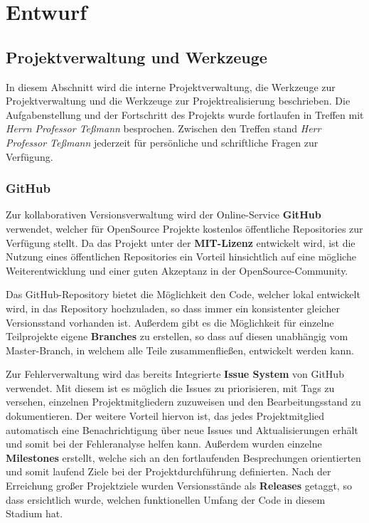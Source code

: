 \chapter{Entwurf}
\section{Projektverwaltung und Werkzeuge}
In diesem Abschnitt wird die interne Projektverwaltung, die Werkzeuge zur Projektverwaltung und die Werkzeuge zur Projektrealisierung beschrieben.
Die Aufgabenstellung und der Fortschritt des Projekts wurde fortlaufen in Treffen mit \textit{Herrn Professor Teßmann} besprochen. Zwischen den Treffen stand \textit{Herr Professor Teßmann} jederzeit für persönliche und schriftliche Fragen zur Verfügung.

\subsection{GitHub}
Zur kollaborativen Versionsverwaltung wird der Online-Service \textbf{GitHub} \cite{GitHub} verwendet, welcher für OpenSource Projekte kostenlos öffentliche Repositories zur Verfügung stellt. Da das Projekt unter der \textbf{MIT-Lizenz} \cite{GitHub:OHMComm License} entwickelt wird, ist die Nutzung eines öffentlichen Repositories ein Vorteil hinsichtlich auf eine mögliche Weiterentwicklung und einer guten Akzeptanz in der OpenSource-Community.

Das GitHub-Repository bietet die Möglichkeit den Code, welcher lokal entwickelt wird, in das Repository hochzuladen, so dass immer ein konsistenter gleicher Versionsstand vorhanden ist. Außerdem gibt es die Möglichkeit für einzelne Teilprojekte eigene \textbf{Branches} zu erstellen, so dass auf diesen unabhängig vom Master-Branch, in welchem alle Teile zusammenfließen, entwickelt werden kann.

Zur Fehlerverwaltung wird das bereits Integrierte \textbf{Issue System} von GitHub verwendet. Mit diesem ist es möglich die Issues zu priorisieren, mit Tags zu versehen, einzelnen Projektmitgliedern zuzuweisen und den Bearbeitungsstand zu dokumentieren. Der weitere Vorteil hiervon ist, das jedes Projektmitglied automatisch eine Benachrichtigung über neue Issues und Aktualisierungen erhält und somit bei der Fehleranalyse helfen kann.
Außerdem wurden einzelne \textbf{Milestones} erstellt, welche sich an den fortlaufenden Besprechungen orientierten und somit laufend Ziele bei der Projektdurchführung definierten. Nach der Erreichung großer Projektziele wurden Versionsstände als \textbf{Releases} getaggt, so dass ersichtlich wurde, welchen funktionellen Umfang der Code in diesem Stadium hat.

